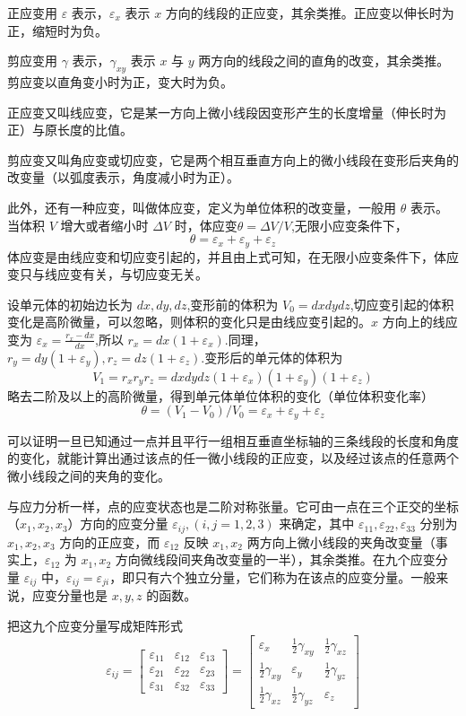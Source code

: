 \documentclass[12pt,a4paper]{article}
\begin{document}
正应变用 $\varepsilon$ 表示，$\varepsilon_x$ 表示 $x$ 方向的线段的正应变，其余类推。正应变以伸长时为正，缩短时为负。

剪应变用 $\gamma$ 表示，$\gamma_{xy}$ 表示 $x$ 与 $y$ 两方向的线段之间的直角的改变，其余类推。剪应变以直角变小时为正，变大时为负。

正应变又叫线应变，它是某一方向上微小线段因变形产生的长度增量（伸长时为正）与原长度的比值。

剪应变又叫角应变或切应变，它是两个相互垂直方向上的微小线段在变形后夹角的改变量（以弧度表示，角度减小时为正）。

此外，还有一种应变，叫做体应变，定义为单位体积的改变量，一般用 $\theta$ 表示。当体积 $V$ 增大或者缩小时 $\Delta V$ 时，体应变$\theta=\Delta V/V$,无限小应变条件下，
$$
\theta=\varepsilon_x+\varepsilon_y+\varepsilon_z
$$
体应变是由线应变和切应变引起的，并且由上式可知，在无限小应变条件下，体应变只与线应变有关，与切应变无关。

设单元体的初始边长为 $dx,dy,dz$,变形前的体积为 $V_0=dxdydz$,切应变引起的体积变化是高阶微量，可以忽略，则体积的变化只是由线应变引起的。$x$ 方向上的线应变为 $\varepsilon_x=\frac{r_x-dx}{dx}$,所以 $r_x=dx(1+\varepsilon_x)$.同理，$r_y=dy(1+\varepsilon_y),r_z=dz(1+\varepsilon_z)$.变形后的单元体的体积为
$$
V_1=r_xr_yr_z=dxdydz(1+\varepsilon_x)(1+\varepsilon_y)(1+\varepsilon_z)
$$
略去二阶及以上的高阶微量，得到单元体单位体积的变化（单位体积变化率）
$$
\theta=(V_1-V_0)/V_0=\varepsilon_x+\varepsilon_y+\varepsilon_z
$$

可以证明一旦已知通过一点并且平行一组相互垂直坐标轴的三条线段的长度和角度的变化，就能计算出通过该点的任一微小线段的正应变，以及经过该点的任意两个微小线段之间的夹角的变化。

与应力分析一样，点的应变状态也是二阶对称张量。它可由一点在三个正交的坐标（$x_1,x_2,x_3$）方向的应变分量 $\varepsilon_{ij},(i,j=1,2,3)$ 来确定，其中 $\varepsilon_{11},\varepsilon_{22},\varepsilon_{33}$ 分别为 $x_1,x_2,x_3$ 方向的正应变，而 $\varepsilon_{12}$ 反映 $x_1,x_2$ 两方向上微小线段的夹角改变量（事实上，$\varepsilon_{12}$ 为 $x_1,x_2$ 方向微线段间夹角改变量的一半），其余类推。在九个应变分量 $\varepsilon_{ij}$ 中，$\varepsilon_{ij}=\varepsilon_{ji}$，即只有六个独立分量，它们称为在该点的应变分量。一般来说，应变分量也是 $x,y,z$ 的函数。

把这九个应变分量写成矩阵形式
$$
\varepsilon_{ij}=
\begin{bmatrix}
\varepsilon_{11} & \varepsilon_{12} & \varepsilon_{13} \\
\varepsilon_{21} & \varepsilon_{22} & \varepsilon_{23} \\
\varepsilon_{31} & \varepsilon_{32} & \varepsilon_{33}
\end{bmatrix}=
\begin{bmatrix}
\varepsilon_{x} & \frac{1}{2}\gamma_{xy} & \frac{1}{2}\gamma_{xz} \\
\frac{1}{2}\gamma_{xy} & \varepsilon_{y} & \frac{1}{2}\gamma_{yz} \\
\frac{1}{2}\gamma_{xz} & \frac{1}{2}\gamma_{yz} & \varepsilon_{z}
\end{bmatrix}
$$
\end{document}
